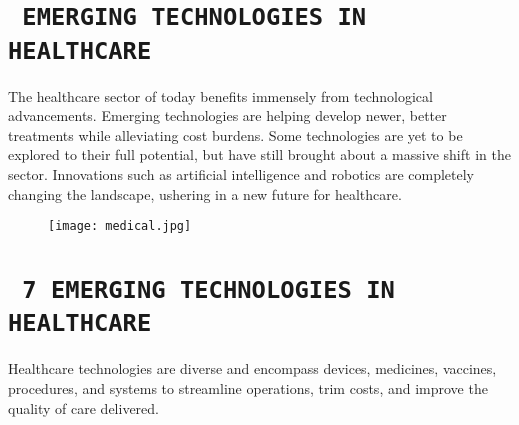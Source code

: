 \documentclass[12pt]{article}
\begin{document}
\section{\LARGE\centering\texttt{ EMERGING TECHNOLOGIES IN HEALTHCARE }}
\large\flushleft The healthcare sector of today benefits immensely from technological advancements. Emerging technologies are helping develop newer, better treatments while alleviating cost burdens. Some technologies are yet to be explored to their full potential, but have still brought about a massive shift in the sector. Innovations such as artificial intelligence and robotics are completely changing the landscape, ushering in a new future for healthcare.\\
\begin{figure}[h]
\centering
\texttt{[image: medical.jpg]}
\end{figure}

\pagebreak
\section{\LARGE\centering\texttt{ 7 EMERGING TECHNOLOGIES IN HEALTHCARE }}


Healthcare technologies are diverse and encompass devices, medicines, vaccines, procedures, and systems to streamline operations, trim costs, and improve the quality of care delivered. \\
\end{document}
